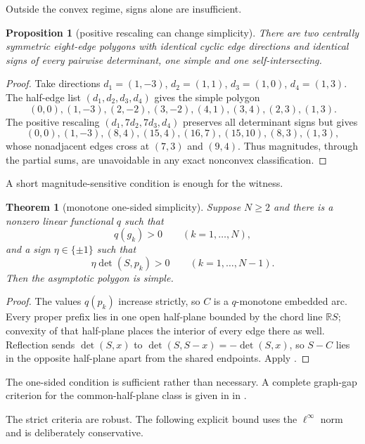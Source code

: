 \documentclass[11pt,twoside,leqno]{article}
\theoremstyle{plain}
\newtheorem{theorem}{Theorem}[section]
\newtheorem{proposition}[proposition]{Proposition}
\theoremstyle{definition}
\theoremstyle{remark}
\newcommand{\R}{\mathbb{R}}
\begin{document}
Outside the convex regime, signs alone are insufficient.

\begin{proposition}[positive rescaling can change simplicity]\label{prop:sign-insufficient}
There are two centrally symmetric eight-edge polygons with identical cyclic edge directions and identical signs of every pairwise determinant, one simple and one self-intersecting.
\end{proposition}

\begin{proof}
Take directions $d_1=(1,-3)$, $d_2=(1,1)$, $d_3=(1,0)$, $d_4=(1,3)$. The half-edge list $(d_1,d_2,d_3,d_4)$ gives the simple polygon
\[
(0,0),(1,-3),(2,-2),(3,-2),(4,1),(3,4),(2,3),(1,3).
\]
The positive rescaling $(d_1,7d_2,7d_3,d_4)$ preserves all determinant signs but gives
\[
(0,0),(1,-3),(8,4),(15,4),(16,7),(15,10),(8,3),(1,3),
\]
whose nonadjacent edges cross at $(7,3)$ and $(9,4)$.  Thus magnitudes, through the partial sums, are unavoidable in any exact nonconvex classification.
\end{proof}

A short magnitude-sensitive condition is enough for the witness.

\begin{theorem}[monotone one-sided simplicity]\label{thm:one-sided}
Suppose $N\ge2$ and there is a nonzero linear functional $q$ such that
\[
 q(g_k)>0\qquad(k=1,\ldots,N),
\]
and a sign $\eta\in\{\pm1\}$ such that
\[
 \eta\det(S,p_k)>0\qquad(k=1,\ldots,N-1).
\]
Then the asymptotic polygon is simple.
\end{theorem}

\begin{proof}
The values $q(p_k)$ increase strictly, so $C$ is a $q$-monotone embedded arc. Every proper prefix lies in one open half-plane bounded by the chord line $\R S$; convexity of that half-plane places the interior of every edge there as well.  Reflection sends $\det(S,x)$ to $\det(S,S-x)=-\det(S,x)$, so $S-C$ lies in the opposite half-plane apart from the shared endpoints.  Apply .
\end{proof}

The one-sided condition is sufficient rather than necessary. A complete graph-gap criterion for the common-half-plane class is given in  in .

The strict criteria are robust.  The following explicit bound uses the $\ell^\infty$ norm and is deliberately conservative.
\end{document}
